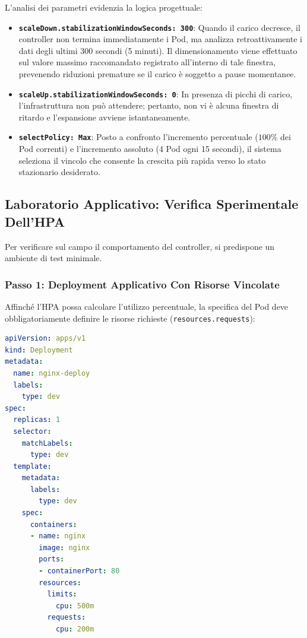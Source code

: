 \documentclass[11pt, a4paper]{article}
\begin{document}
L'analisi dei parametri evidenzia la logica progettuale:
\begin{itemize}[noitemsep]
    \item \textbf{\texttt{scaleDown.stabilizationWindowSeconds: 300}}: Quando il carico decresce, il controller non termina immediatamente i Pod, ma analizza retroattivamente i dati degli ultimi 300 secondi (5 minuti). Il dimensionamento viene effettuato sul valore massimo raccomandato registrato all'interno di tale finestra, prevenendo riduzioni premature se il carico è soggetto a pause momentanee.
    \item \textbf{\texttt{scaleUp.stabilizationWindowSeconds: 0}}: In presenza di picchi di carico, l'infrastruttura non può attendere; pertanto, non vi è alcuna finestra di ritardo e l'espansione avviene istantaneamente.
    \item \textbf{\texttt{selectPolicy: Max}}: Posto a confronto l'incremento percentuale ($100\%$ dei Pod correnti) e l'incremento assoluto ($4$ Pod ogni 15 secondi), il sistema seleziona il vincolo che consente la crescita più rapida verso lo stato stazionario desiderato.
\end{itemize}

\subsection{Laboratorio Applicativo: Verifica Sperimentale Dell'HPA}
Per verificare sul campo il comportamento del controller, si predispone un ambiente di test minimale.

\subsubsection{Passo 1: Deployment Applicativo Con Risorse Vincolate}
Affinché l'HPA possa calcolare l'utilizzo percentuale, la specifica del Pod deve obbligatoriamente definire le risorse richieste (\texttt{resources.requests}):

\begin{lstlisting}[language=yaml, caption={Manifest di Deployment applicativo (\texttt{nginx-deploy.yaml})}]
apiVersion: apps/v1
kind: Deployment
metadata:
  name: nginx-deploy
  labels:
    type: dev
spec:
  replicas: 1
  selector:
    matchLabels:
      type: dev
  template:
    metadata:
      labels:
        type: dev
    spec:
      containers:
      - name: nginx
        image: nginx
        ports:
        - containerPort: 80
        resources:
          limits:
            cpu: 500m
          requests:
            cpu: 200m
\end{lstlisting}
\end{document}
